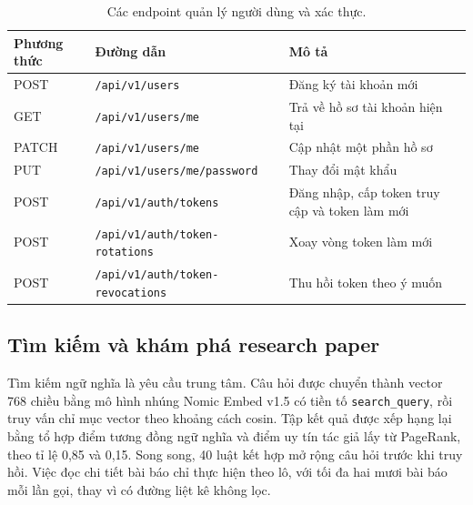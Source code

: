 \begin{table}[htbp]
    \centering
    \caption{Các endpoint quản lý người dùng và xác thực.}
    \label{tab:api-auth}
    \small
    \begin{tabularx}{\textwidth}{@{}l>{\raggedright\arraybackslash}p{6.8cm}>{\raggedright\arraybackslash}X@{}}
        \toprule
        \textbf{Phương thức} & \textbf{Đường dẫn} & \textbf{Mô tả} \\
        \midrule
        POST & \texttt{/api/v1/users} & Đăng ký tài khoản mới \\
        GET & \texttt{/api/v1/users/me} & Trả về hồ sơ tài khoản hiện tại \\
        PATCH & \texttt{/api/v1/users/me} & Cập nhật một phần hồ sơ \\
        PUT & \texttt{/api/v1/users/me/password} & Thay đổi mật khẩu \\
        POST & \texttt{/api/v1/auth/tokens} & Đăng nhập, cấp token truy cập và token làm mới \\
        POST & \texttt{/api/v1/auth/token-rotations} & Xoay vòng token làm mới \\
        POST & \texttt{/api/v1/auth/token-revocations} & Thu hồi token theo ý muốn \\
        \bottomrule
    \end{tabularx}
\end{table}

\subsection{Tìm kiếm và khám phá research paper}
\label{subsec:tim-kiem-paper}

Tìm kiếm ngữ nghĩa là yêu cầu trung tâm. Câu hỏi được chuyển thành vector 768 chiều bằng mô hình nhúng Nomic Embed v1.5 có tiền tố \texttt{search\_query}, rồi truy vấn chỉ mục vector theo khoảng cách cosin. Tập kết quả được xếp hạng lại bằng tổ hợp điểm tương đồng ngữ nghĩa và điểm uy tín tác giả lấy từ PageRank, theo tỉ lệ 0,85 và 0,15. Song song, 40 luật kết hợp mở rộng câu hỏi trước khi truy hồi. Việc đọc chi tiết bài báo chỉ thực hiện theo lô, với tối đa hai mươi bài báo mỗi lần gọi, thay vì có đường liệt kê không lọc.

